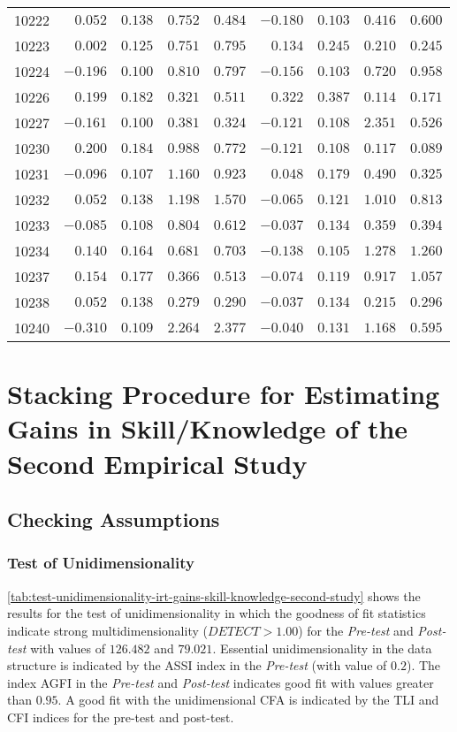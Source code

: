 {\begin{longtable}{l|rrrr|rrrr}
10222&$ 0.052$&$0.138$&$0.752$&$0.484$&$-0.180$&$0.103$&$0.416$&$0.600$\tabularnewline
10223&$ 0.002$&$0.125$&$0.751$&$0.795$&$ 0.134$&$0.245$&$0.210$&$0.245$\tabularnewline
10224&$-0.196$&$0.100$&$0.810$&$0.797$&$-0.156$&$0.103$&$0.720$&$0.958$\tabularnewline
10226&$ 0.199$&$0.182$&$0.321$&$0.511$&$ 0.322$&$0.387$&$0.114$&$0.171$\tabularnewline
10227&$-0.161$&$0.100$&$0.381$&$0.324$&$-0.121$&$0.108$&$2.351$&$0.526$\tabularnewline
10230&$ 0.200$&$0.184$&$0.988$&$0.772$&$-0.121$&$0.108$&$0.117$&$0.089$\tabularnewline
10231&$-0.096$&$0.107$&$1.160$&$0.923$&$ 0.048$&$0.179$&$0.490$&$0.325$\tabularnewline
10232&$ 0.052$&$0.138$&$1.198$&$1.570$&$-0.065$&$0.121$&$1.010$&$0.813$\tabularnewline
10233&$-0.085$&$0.108$&$0.804$&$0.612$&$-0.037$&$0.134$&$0.359$&$0.394$\tabularnewline
10234&$ 0.140$&$0.164$&$0.681$&$0.703$&$-0.138$&$0.105$&$1.278$&$1.260$\tabularnewline
10237&$ 0.154$&$0.177$&$0.366$&$0.513$&$-0.074$&$0.119$&$0.917$&$1.057$\tabularnewline
10238&$ 0.052$&$0.138$&$0.279$&$0.290$&$-0.037$&$0.134$&$0.215$&$0.296$\tabularnewline
10240&$-0.310$&$0.109$&$2.264$&$2.377$&$-0.040$&$0.131$&$1.168$&$0.595$\tabularnewline
\hline
\end{longtable}}




\section{Stacking Procedure for Estimating Gains in Skill/Knowledge of the Second Empirical Study}
\label{sec:irt-learning-outcomes-second-study}


\subsection{Checking Assumptions}

\subsubsection*{Test of Unidimensionality}

\autoref{tab:test-unidimensionality-irt-gains-skill-knowledge-second-study} shows the results for the test of unidimensionality in which the goodness of fit statistics indicate strong multidimensionality ($DETECT > 1.00$) for the \emph{Pre-test} and \emph{Post-test} with values of $126.482$ and $79.021$. 
Essential unidimensionality in the data structure is indicated by the ASSI index in the \emph{Pre-test} (with value of $0.2$).
The index AGFI in the \emph{Pre-test} and \emph{Post-test} indicates good fit with values greater than $0.95$.
A good fit with the unidimensional CFA is indicated by the TLI and CFI indices for the pre-test and post-test.

